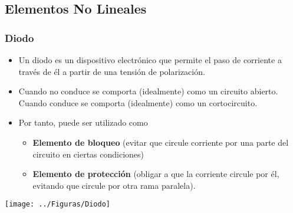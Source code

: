 \documentclass[serif, xcolor=dvipsnames]{beamer}
\begin{document}
\subsection{Elementos No Lineales}

\begin{frame}
  \frametitle{Diodo}
  \begin{itemize}
  \item Un diodo es un dispositivo electrónico que permite el paso de
    corriente a través de él a partir de una tensión de polarización.
  \item Cuando no conduce se comporta (idealmente) como un circuito
    abierto.  Cuando conduce se comporta (idealmente) como un
    cortocircuito.
  \item Por tanto, puede ser utilizado como

    \begin{itemize}
    \item \textbf{Elemento de bloqueo} (evitar que circule corriente
      por una parte del circuito en ciertas condiciones)
    \item \textbf{Elemento de protección} (obligar a que la corriente
      circule por él, evitando que circule por otra rama paralela).
    \end{itemize}
  \end{itemize}
  \begin{center}
    \texttt{[image: ../Figuras/Diodo]}
    \par\end{center}


\end{frame}
\end{document}
